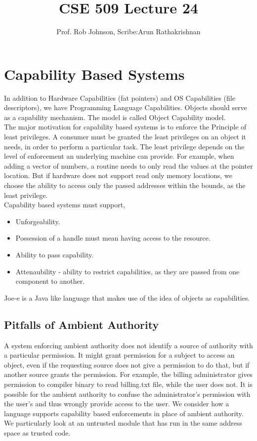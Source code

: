\documentclass[11pt]{article} %
\title{CSE 509 Lecture 24}
\author{Prof. Rob Johnson, Scribe:Arun Rathakrishnan}
\begin{document}
\maketitle
\section {Capability Based Systems}
In addition to Hardware Capabilities (fat pointers) and OS Capabilities (file
descriptors), we have Programming Language Capabilities. Objects should serve
as a capability mechanism. The model is called Object Capability model.\\

The major motivation for capability based systems is to enforce the Principle
of least privileges. A consumer must be granted the least privileges on an object
it needs, in order to perform a particular task. The least privilege depends
on the level of enforcement an underlying machine can provide. For example, when
adding a vector of numbers, a routine needs to only read the values at the pointer
location. But if hardware does not support read only memory locations, we choose
the ability to access only the passed addresses within the bounds, as the least
privilege.\\

Capability based systems must support,
\begin {itemize} \itemsep -2pt
\item Unforgeability.
\item Possession of a handle must mean having access to the resource.
\item Ability to pass capability.
\item Attenaubility - ability to restrict capabilities, as they are passed from
one component to another.
\end {itemize}

Joe-e is a Java like language that makes use of the idea of objects as capabilities.

\subsection {Pitfalls of Ambient Authority}
A system enforcing ambient authority does not identify a source of authority with
a particular permission. It might grant permission for a subject to access an
object, even if the requesting source does not give a permission to do that, but
if another source grants the permission. For example, the billing administrator
gives permission to compiler binary to read billing.txt file, while the user
does not. It is possible for the ambient authority to confuse the 
administrator's permission with the user's and thus wrongly provide access to
the user. We consider how a language supports capability based enforcements in
place of ambient authority. We particularly look at an untrusted module that has 
run in the same address space as trusted code.
\end{document}

